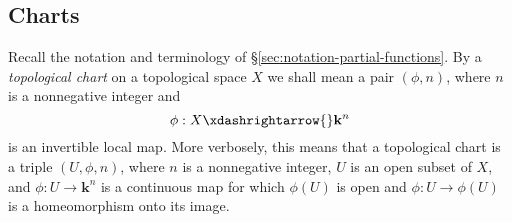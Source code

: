 \documentclass[reqno]{amsart} 
\begin{document}
\subsection{Charts}
\label{sec:org8cf0641}
Recall the notation and terminology of \S\ref{sec:notation-partial-functions}.
By a \emph{topological chart} on a topological space $X$
we shall mean a pair $(\phi,n)$, where $n$ is a nonnegative integer and
\begin{equation*}
\phi : X \xdashrightarrow{} \mathbf{k}^n
\end{equation*}
is an invertible local map.
More verbosely, this means that a topological chart
is a triple
$(U,\phi,n)$, where $n$ is a nonnegative integer, $U$ is an open
subset of $X$, and $\phi : U \rightarrow \mathbf{k}^n$ is a
continuous map for which $\phi(U)$ is open and
$\phi : U \rightarrow \phi(U)$ is a homeomorphism onto its
image.
\end{document}
